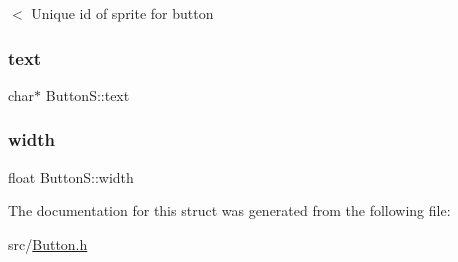 $<$ Unique id of sprite for button \mbox{\label{struct_button_s_a1472d4647423c83d45e4cbdb47c83c6d}} 
\subsubsection{\texorpdfstring{text}{text}}
{\footnotesize\ttfamily char$\ast$ Button\+S\+::text}

\mbox{\label{struct_button_s_aadb7b9512c6e032223e2b4b3bbb5fd8f}} 
\subsubsection{\texorpdfstring{width}{width}}
{\footnotesize\ttfamily float Button\+S\+::width}



The documentation for this struct was generated from the following file\+:\begin{DoxyCompactItemize}
\item 
src/\hyperlink{_button_8h}{Button.\+h}\end{DoxyCompactItemize}
